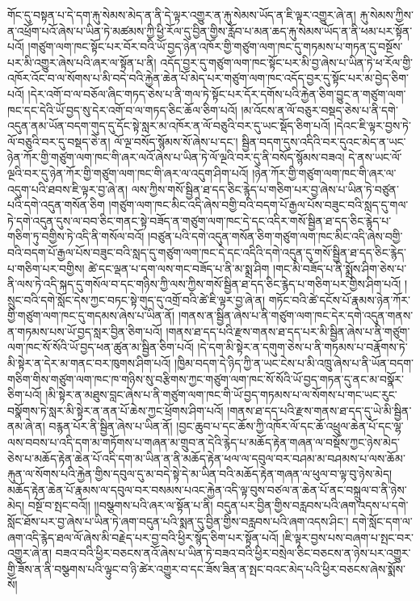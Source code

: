 གོང་དུ་བསྟན་པ་དེ་དག་རྐུ་སེམས་མེད་ན་ནི་དེ་ལྟར་འགྱུར་ན་རྐུ་སེམས་ཡོད་ན་ཇི་ལྟར་འགྱུར་ཞེ་ན། རྐུ་སེམས་ཀྱིས་ན་འཕྲོག་པའོ་ཞེས་པ་ཡིན་ཏེ་མཚམས་ཀྱི་ཕྱི་རོལ་དུ་བྱིན་གྱིས་རློབ་པ་མན་ཆད་རྐུ་སེམས་ཡོད་ན་ནི་ཕམ་པར་སྟོན་པའོ། །གཙུག་ལག་ཁང་སྟོང་པར་བོར་བའི་ཡོ་བྱད་ཉེན་འཁོར་གྱི་གཙུག་ལག་ཁང་དུ་གཏམས་པ་གཏན་དུ་བསྔོས་པར་མི་འགྱུར་ཞེས་པའི་ཞར་ལ་སྟོན་པ་ནི། འདོད་བྱར་དུ་གཙུག་ལག་ཁང་སྟོང་པར་མི་བྱ་ཞེས་པ་ཡིན་ཏེ་ཕ་རོལ་གྱི་འཁོར་འོང་བ་ལ་སོགས་པ་མི་བདེ་བའི་རྐྱེན་ཆེན་པོ་མེད་པར་གཙུག་ལག་ཁང་འདོད་བྱར་དུ་སྟོང་པར་མ་བྱེད་ཅིག་པའོ། །དེར་འགོ་བ་ལ་བཅོལ་ཞིང་གཏད་ཅེས་པ་ནི་གལ་ཏེ་སྟོང་པར་དོར་དགོས་པའི་རྐྱེན་ཅིག་བྱུང་ན་གཙུག་ལག་ཁང་དང་དེའི་ཡོ་བྱད་སུ་དེར་འགོ་བ་ལ་གཏད་ཅིང་ཆོལ་ཅིག་པའོ། །མ་འོངས་ན་ལོ་བཅུར་བསྡད་ཅེས་པ་ནི་དགེ་འདུན་ནམ་ཡོན་བདག་གུད་དུ་དོང་སྟེ་སླར་མ་འཁོར་ན་ལོ་བཅུའི་བར་དུ་ཡང་སྡོད་ཅིག་པའོ། །དེའང་ཇི་ལྟར་བྱས་ཏེ་ལོ་བཅུའི་བར་དུ་བསྡད་ཅེ་ན། ལོ་ལྔ་བསོད་སྙོམས་སོ་ཞེས་པ་དང་། སྦྱིན་བདག་དུས་འདིའི་བར་དུའང་མེད་ན་ཡང་ཉེན་ཀོར་གྱི་གཙུག་ལག་ཁང་གི་ཞར་ལའོ་ཞེས་པ་ཡིན་ཏེ་ལོ་ལྔའི་བར་དུ་ནི་བསོད་སྙོམས་བཟའ། དེ་ནས་ཡང་ལོ་ལྔའི་བར་དུ་ཉེན་ཀོར་གྱི་གཙུག་ལག་ཁང་གི་ཞར་ལ་འདུག་ཤིག་པའོ། །ཉེན་ཀོར་གྱི་གཙུག་ལག་ཁང་གི་ཞར་ལ་འདུག་པའི་ཐབས་ཇི་ལྟར་བྱ་ཞེ་ན། ལས་ཀྱིས་གསོ་སྦྱིན་ཐ་དད་ཅིང་རྙེད་པ་གཅིག་པར་བྱ་ཞེས་པ་ཡིན་ཏེ་བཙུན་པའི་དགེ་འདུན་གསོན་ཅིག །གཙུག་ལག་ཁང་མིང་འདི་ཞེས་བགྱི་བའི་བདག་པོ་རྒྱལ་པོས་བཟུང་བའི་སླད་དུ་གལ་ཏེ་དགེ་འདུན་དུས་ལ་བབ་ཅིང་གནང་སྟེ་བཟོད་ན་གཙུག་ལག་ཁང་དེ་དང་འདིར་གསོ་སྦྱིན་ཐ་དད་ཅིང་རྙེད་པ་གཅིག་ཏུ་བགྱིས་ཏེ་འདི་ནི་གསོལ་བའོ། །བཙུན་པའི་དགེ་འདུན་གསོན་ཅིག་གཙུག་ལག་ཁང་མིང་འདི་ཞེས་བགྱི་བའི་བདག་པོ་རྒྱལ་པོས་བཟུང་བའི་སླད་དུ་གཙུག་ལག་ཁང་དེ་དང་འདིའི་དགེ་འདུན་དུ་གསོ་སྦྱིན་ཐ་དད་ཅིང་རྙེད་པ་གཅིག་པར་བགྱིས། ཚེ་དང་ལྡན་པ་དག་ལས་གང་བཟོད་པ་ནི་མ་སྨྲ་ཤིག །གང་མི་བཟོད་པ་ནི་སྨྲོས་ཤིག་ཅེས་པ་ནི་ལས་ཏེ་འདི་སྐད་དུ་གསོལ་བ་དང་གཉིས་ཀྱི་ལས་ཀྱིས་གསོ་སྦྱིན་ཐ་དད་ཅིང་རྙེད་པ་གཅིག་པར་གྱིས་ཤིག་པའོ། །སྲུང་བའི་དགེ་སློང་དེས་ཀྱང་བཏང་སྟེ་གུད་དུ་འགྲོ་བའི་ཚེ་ཇི་ལྟར་བྱ་ཞེ་ན། གཏོང་བའི་ཚེ་དངོས་པོ་རྣམས་ཉེན་ཀོར་གྱི་གཙུག་ལག་ཁང་དུ་གདམས་ཞེས་པ་ཡིན་ནོ། །གནས་ན་སྦྱིན་ཞེས་པ་ནི་གཙུག་ལག་ཁང་དེར་དགེ་འདུན་གནས་ན་གཏམས་པས་ཡོ་བྱད་སླར་བྱིན་ཅིག་པའོ། །གནས་ཐ་དད་པའི་རྫས་གནས་ཐ་དད་པར་མི་སྦྱིན་ཞེས་པ་ནི་གཙུག་ལག་ཁང་སོ་སོའི་ཡོ་བྱད་ཕན་ཚུན་མ་སྦྱིན་ཅིག་པའོ། །དེ་དག་མི་སྟེར་ན་དགུག་ཅེས་པ་ནི་གཏམས་པ་བརྣོགས་ཏེ་མི་སྟེར་ན་དེར་མ་གནང་བར་ཁུགས་ཤིག་པའོ། །ཁྱིམ་བདག་དེ་ཉིད་ཀྱི་ན་ཡང་ངེས་པ་མི་འཁྲུ་ཞེས་པ་ནི་ཡོན་བདག་གཅིག་གིས་གཙུག་ལག་ཁང་ཁ་གཉིས་སུ་བརྩིགས་ཀྱང་གཙུག་ལག་ཁང་སོ་སོའི་ཡོ་བྱད་གཏན་དུ་ནང་མ་བསྣོར་ཅིག་པའོ། །མི་སྟེར་ན་མཐུས་བླང་ཞེས་པ་ནི་གཙུག་ལག་ཁང་གི་ཡོ་བྱད་གཏམས་པ་ལ་སོགས་པ་གང་ཡང་རུང་བསྣོགས་ཏེ་སླར་མི་སྟེར་ན་ནན་པོ་ཆེས་ཀྱང་ཕྲོགས་ཤིག་པའོ། །གནས་ཐ་དད་པའི་རྫས་གནས་ཐ་དད་དུ་ཡེ་མི་སྦྱིན་ནམ་ཞེ་ན། བརྙན་པོར་ནི་སྦྱིན་ཞེས་པ་ཡིན་ནོ། །བྱང་ཆུབ་པ་དང་ཆོས་ཀྱི་འཁོར་ལོ་དང་ཆོ་འཕྲུལ་ཆེན་པོ་དང་ལྷ་ལས་བབས་པ་འདི་དག་མ་གཏོགས་པ་གཞན་མ་གྲུབ་ན་དེའི་རྙེད་པ་མཆོད་རྟེན་གཞན་ལ་བསྡོས་ཀྱང་ཉེས་མེད་ཅེས་པ་མཆོད་རྟེན་ཆེན་པོ་འདི་དག་མ་ཡིན་ན་ནི་མཆོད་རྟེན་ཕལ་ལ་དབུལ་བར་བཤམ་མ་བཤམས་པ་ལས་ཆོམ་རྐུན་ལ་སོགས་པའི་རྐྱེན་གྱིས་དབུལ་དུ་མ་བདེ་སྟེ་དེ་མ་ཡིན་བའི་མཆོད་རྟེན་གཞན་ལ་ཕུལ་བ་ལྟ་བུ་ཉེས་མེད། མཆོད་རྟེན་ཆེན་པོ་རྣམས་ལ་དབུལ་བར་བསམས་པའང་རྐྱེན་འདི་ལྟ་བུས་བཙལ་ན་ཆེན་པོ་ནང་བསྐྲུལ་བ་ནི་ཉེས་མེད། བསྔོ་བ་སྤང་བའོ།། །།བསྩགས་པའི་ཞར་ལ་སྟོན་པ་ནི། བདུན་པར་བྱིན་གྱིས་བརླབས་པའི་ཞག་འདས་པ་དགེ་སློང་ཐོས་པར་བྱ་ཞེས་པ་ཡིན་ཏེ་ཞག་བདུན་པའི་སྨན་དུ་བྱིན་གྱིས་བརླབས་པའི་ཞག་འདས་ཤིང་། དགེ་སློང་དག་ལ་ཞག་འདི་རྙེད་ཐལ་ལོ་ཞེས་མི་བརྗེད་པར་བྱ་བའི་ཕྱིར་སྙོད་ཅིག་པར་སྟོན་པའོ། །ཇི་ལྟར་བྱས་པས་བཞག་པ་སྤང་བར་འགྱུར་ཞེ་ན། བཟའ་བའི་ཕྱིར་བཅངས་ནའོ་ཞེས་པ་ཡིན་ཏེ་བཟའ་བའི་ཕྱིར་བསྲེལ་ཅིང་བཅངས་ན་ཉེས་པར་འགྱུར་གྱི་ཟོས་ན་ནི་བསྩགས་པའི་ལྟུང་བ་ཉི་ཚེར་འགྱུར་བ་དང་ཟོས་ཟིན་ན་སྤང་བའང་མེད་པའི་ཕྱིར་བཅངས་ཞེས་སྨོས་སོ། 